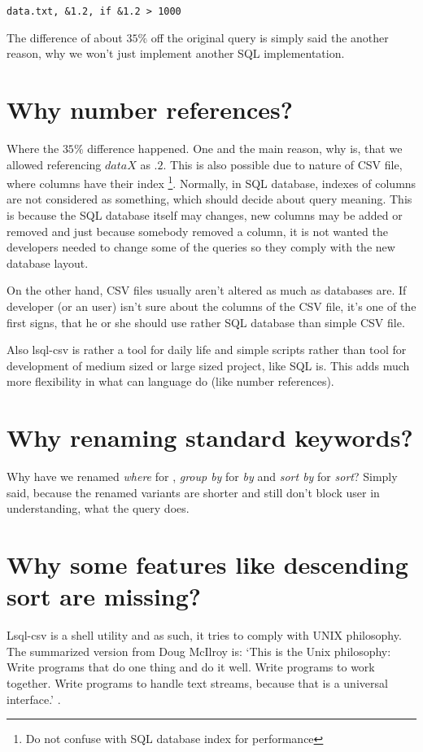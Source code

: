 \begin{verbatim}
data.txt, &1.2, if &1.2 > 1000
\end{verbatim}

The difference of about $35\%$ off the original query is simply said the another reason, 
why we won't just implement another SQL implementation.

\section{Why number references?}
Where the $35\%$ difference happened. One and the main reason, why is, that we allowed referencing $dataX$ as $.2$.
This is also possible due to nature of CSV file, where columns have their index
\footnote{Do not confuse with SQL database index for performance}. 
Normally, in SQL database, indexes of columns are not considered as something, which should decide about query meaning.
This is because the SQL database itself may changes, new columns may be added or removed and just because somebody removed a column, it is not wanted the developers needed to change some of the queries so they comply with the new database layout.

On the other hand, CSV files usually aren't altered as much as databases are. 
If developer (or an user) isn't sure about the columns of the CSV file, it's one of the first signs, that
he or she should use rather SQL database than simple CSV file.

Also lsql-csv is rather a tool for daily life and simple scripts rather than tool for development of medium sized or
large sized project, like SQL is. This adds much more flexibility in what can language do (like number references).

\section{Why renaming standard keywords?}
Why have we renamed \textit{where} for , \textit{group by} for \textit{by} and \textit{sort by} for \textit{sort}? Simply said, because the renamed variants are shorter and still don't block user in understanding, what the query does.

\section{Why some features like descending sort are missing?}
Lsql-csv is a shell utility and as such, it tries to comply with UNIX philosophy. 
The summarized version from Doug McIlroy is: `This is the Unix philosophy: Write programs that do one thing and do it well. Write programs to work together. Write programs to handle text streams, because that is a universal interface.' \cite{unix-philosophy}.

